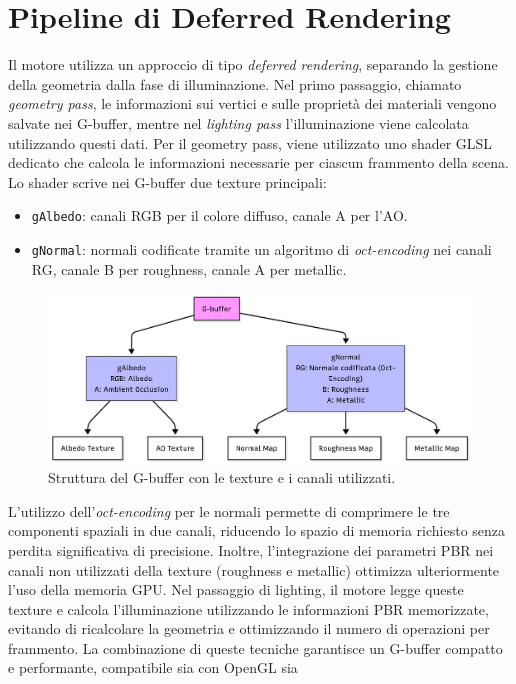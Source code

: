 \documentclass[12pt,a4paper,openright,twoside]{book}
\begin{document}
\section{Pipeline di Deferred Rendering}
Il motore utilizza un approccio di tipo \emph{deferred rendering}, separando la gestione della geometria dalla fase
di illuminazione. Nel primo passaggio, chiamato \emph{geometry pass}, le informazioni sui vertici e sulle proprietà dei
materiali vengono salvate nei G-buffer, mentre nel \emph{lighting pass} l'illuminazione viene calcolata utilizzando
questi dati.
Per il geometry pass, viene utilizzato uno shader GLSL dedicato che calcola le informazioni necessarie per ciascun
frammento della scena. Lo shader scrive nei G-buffer due texture principali:
\begin{itemize}
    \item \texttt{gAlbedo}: canali RGB per il colore diffuso, canale A per l'AO.
    \item \texttt{gNormal}: normali codificate tramite un algoritmo di \emph{oct-encoding} nei canali RG, canale B per roughness, canale A per metallic.
\end{itemize}
\begin{figure}[H]
    \centering
    \includegraphics[width=.8\linewidth]{figures/g_buffer_textures.png}
    \caption{Struttura del G-buffer con le texture e i canali utilizzati.}
    \label{fig:g-buffer-textures}
\end{figure}
L'utilizzo dell'\emph{oct-encoding} per le normali permette di comprimere le tre componenti spaziali in due canali,
riducendo lo spazio di memoria richiesto senza perdita significativa di precisione. Inoltre, l'integrazione dei parametri
PBR nei canali non utilizzati della texture (roughness e metallic) ottimizza ulteriormente l'uso della memoria GPU.
Nel passaggio di lighting, il motore legge queste texture e calcola l'illuminazione utilizzando le informazioni PBR
memorizzate, evitando di ricalcolare la geometria e ottimizzando il numero di operazioni per frammento.
La combinazione di queste tecniche garantisce un G-buffer compatto e performante, compatibile sia con OpenGL sia
\end{document}
